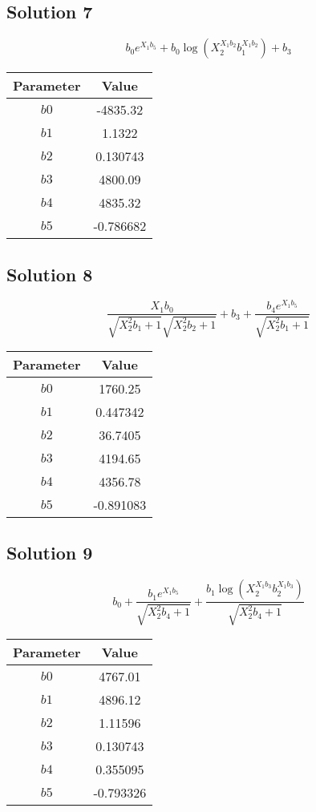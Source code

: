 \documentclass{article}
\begin{document}
\vspace{1em}
\subsection*{Solution 7}
\[
b_{0} e^{X_{1} b_{5}} + b_{0} \log{\left(X_{2}^{X_{1} b_{2}} b_{1}^{X_{1} b_{2}} \right)} + b_{3}
\]
\begin{center}
\begin{tabular}{cc}
\toprule
Parameter & Value \\
\midrule
$b0$ & -4835.32 \\
$b1$ & 1.1322 \\
$b2$ & 0.130743 \\
$b3$ & 4800.09 \\
$b4$ & 4835.32 \\
$b5$ & -0.786682 \\
\bottomrule
\end{tabular}
\end{center}

\vspace{1em}
\subsection*{Solution 8}
\[
\frac{X_{1} b_{0}}{\sqrt{X_{2}^{2} b_{1} + 1} \sqrt{X_{2}^{2} b_{2} + 1}} + b_{3} + \frac{b_{4} e^{X_{1} b_{5}}}{\sqrt{X_{2}^{2} b_{1} + 1}}
\]
\begin{center}
\begin{tabular}{cc}
\toprule
Parameter & Value \\
\midrule
$b0$ & 1760.25 \\
$b1$ & 0.447342 \\
$b2$ & 36.7405 \\
$b3$ & 4194.65 \\
$b4$ & 4356.78 \\
$b5$ & -0.891083 \\
\bottomrule
\end{tabular}
\end{center}

\vspace{1em}
\subsection*{Solution 9}
\[
b_{0} + \frac{b_{1} e^{X_{1} b_{5}}}{\sqrt{X_{2}^{2} b_{4} + 1}} + \frac{b_{1} \log{\left(X_{2}^{X_{1} b_{3}} b_{2}^{X_{1} b_{3}} \right)}}{\sqrt{X_{2}^{2} b_{4} + 1}}
\]
\begin{center}
\begin{tabular}{cc}
\toprule
Parameter & Value \\
\midrule
$b0$ & 4767.01 \\
$b1$ & 4896.12 \\
$b2$ & 1.11596 \\
$b3$ & 0.130743 \\
$b4$ & 0.355095 \\
$b5$ & -0.793326 \\
\bottomrule
\end{tabular}
\end{center}
\end{document}
